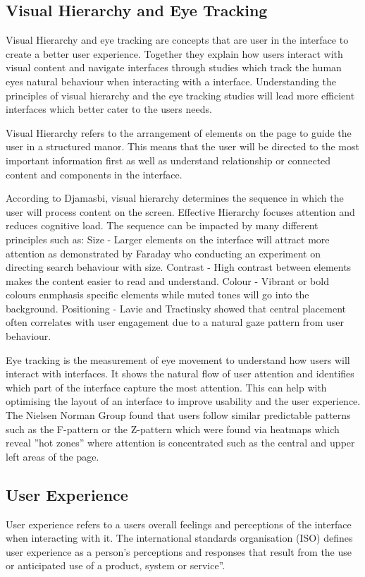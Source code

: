 \documentclass[]{project_final}
\begin{document}
\subsection{Visual Hierarchy and Eye Tracking}

Visual Hierarchy and eye tracking are concepts that are user in the interface to create a better user experience. Together they explain how users interact with visual content and navigate interfaces through studies which track the human eyes natural behaviour when interacting with a interface. Understanding the principles of visual hierarchy and the eye tracking studies will lead more efficient interfaces which better cater to the users needs.

Visual Hierarchy refers to the arrangement of elements on the page to guide the user in a structured manor. This means that the user will be directed to the most important information first as well as understand relationship or connected content and components in the interface.

According to Djamasbi, visual hierarchy determines the sequence in which the user will
process content on the screen. Effective Hierarchy focuses attention and reduces cognitive
load. The sequence can be impacted by many different principles such as:
Size - Larger elements on the interface will attract more attention as demonstrated by
Faraday who conducting an experiment on directing search behaviour with size.
Contrast - High contrast between elements makes the content easier to read and understand.
Colour - Vibrant or bold colours enmphasis specific elements while muted tones will go into
the background.
Positioning - Lavie and Tractinsky showed that central placement often correlates with user
engagement due to a natural gaze pattern from user behaviour.

Eye tracking is the measurement of eye movement to understand how users will interact
with interfaces. It shows the natural flow of user attention and identifies which part of the
interface capture the most attention. This can help with optimising the layout of an interface
to improve usability and the user experience. The Nielsen Norman Group found that users
follow similar predictable patterns such as the F-pattern or the Z-pattern which were found
via heatmaps which reveal ”hot zones” where attention is concentrated such as the central
and upper left areas of the page.

\subsection{User Experience}
User experience refers to a users overall feelings and perceptions of the interface when interacting with it. The international standards organisation (ISO) defines user experience as a person's perceptions and responses that result from the use or anticipated use of a product, system or service”.
\end{document}
